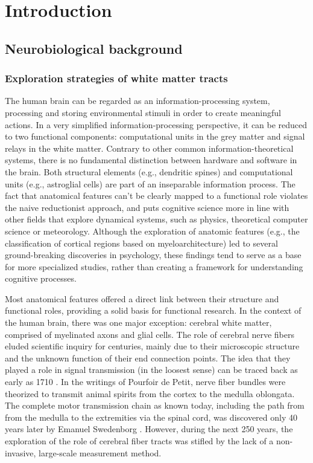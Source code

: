 \chapter{Introduction}

\section{Neurobiological background}
\subsection{Exploration strategies of white matter tracts}
The human brain can be regarded as an information-processing system, processing and storing environmental stimuli in order to create meaningful actions. 
In a very simplified information-processing perspective, it can be reduced to two functional components: computational units in the grey matter and signal relays in the white matter.
Contrary to other common information-theoretical systems, there is no fundamental distinction between hardware and software in the brain.
Both structural elements (e.g., dendritic spines) and computational units (e.g., astroglial cells) are part of an inseparable information process.
The fact that anatomical features can't be clearly mapped to a functional role violates the naive reductionist approach, and puts cognitive science more in line with other fields that explore dynamical systems, such as physics, theoretical computer science or meteorology.
Although the exploration of anatomic features (e.g., the classification of cortical regions based on myeloarchitecture) led to several ground-breaking discoveries in psychology, these findings tend to serve as a base for more specialized studies, rather than creating a framework for understanding cognitive processes.

Most anatomical features offered a direct link between their structure and functional roles, providing a solid basis for functional research.
In the context of the human brain, there was one major exception: cerebral white matter, comprised of myelinated axons and glial cells.
The role of cerebral nerve fibers eluded scientific inquiry for centuries, mainly due to their microscopic structure and the unknown function of their end connection points.
The idea that they played a role in signal transmission (in the loosest sense) can be traced back as early as 1710 \cite{1.1.history}.
In the writings of Pourfoir de Petit, nerve fiber bundles were theorized to transmit animal spirits from the cortex to the medulla oblongata.
The complete motor transmission chain as known today, including the path from from the medulla to the extremities via the spinal cord, was discovered only 40 years later by Emanuel Swedenborg \cite{1.1.history}.
However, during the next 250 years, the exploration of the role of cerebral fiber tracts was stifled by the lack of a non-invasive, large-scale measurement method.

